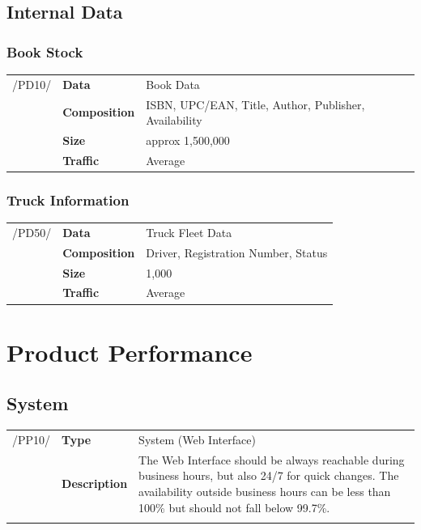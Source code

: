\documentclass[11pt,a4paper,oneside,svgnames]{report}
\begin{document}
\section{Internal Data}
\subsection{Book Stock}
\begin{tabular}{llp{10cm}}
\cellcolor{white}/PD10/	& \textbf{Data}			& Book Data\\
\cellcolor{white}		& \textbf{Composition}	& ISBN, UPC/EAN, Title, Author, Publisher, Availability\\
\cellcolor{white}		& \textbf{Size}		& approx 1,500,000\\
\cellcolor{white}		& \textbf{Traffic}		& Average\\
\end{tabular} 
\subsection{Truck Information}
\begin{tabular}{llp{10cm}}
\cellcolor{white}/PD50/	& \textbf{Data}			& Truck Fleet Data\\
\cellcolor{white}		& \textbf{Composition}	& Driver, Registration Number, Status\\
\cellcolor{white}		& \textbf{Size}		& 1,000\\
\cellcolor{white}		& \textbf{Traffic}		& Average\\
\end{tabular} 

\chapter{Product Performance}
\section{System}
\noindent
\begin{tabular}{llp{10cm}}
\cellcolor{white}/PP10/	& \textbf{Type}			& System (Web Interface)\\
\cellcolor{white}		& \textbf{Description}	& The Web Interface should be always reachable during business hours, but also 24/7 for quick changes. The availability outside business hours can be less than 100\% but should not fall below 99.7\%.\\
\cellcolor{white}		\hfill \\
\end{tabular}
\end{document}

